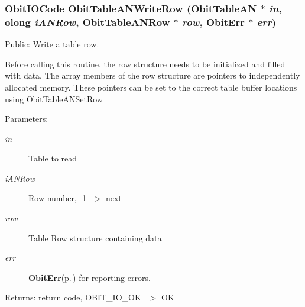 \subsubsection{\setlength{\rightskip}{0pt plus 5cm}Obit\-IOCode Obit\-Table\-ANWrite\-Row ({\bf Obit\-Table\-AN} $\ast$ {\em in}, {\bf olong} {\em i\-ANRow}, {\bf Obit\-Table\-ANRow} $\ast$ {\em row}, {\bf Obit\-Err} $\ast$ {\em err})}\label{ObitTableAN_8c_a24}


Public: Write a table row. 

Before calling this routine, the row structure needs to be initialized and filled with data. The array members of the row structure are pointers to independently allocated memory. These pointers can be set to the correct table buffer locations using Obit\-Table\-ANSet\-Row \begin{Desc}
\item[Parameters:]
\begin{description}
\item[{\em in}]Table to read \item[{\em i\-ANRow}]Row number, -1 -$>$ next \item[{\em row}]Table Row structure containing data \item[{\em err}]{\bf Obit\-Err}{\rm (p.\,\pageref{structObitErr})} for reporting errors. \end{description}
\end{Desc}
\begin{Desc}
\item[Returns:]return code, OBIT\_\-IO\_\-OK=$>$ OK \end{Desc}
